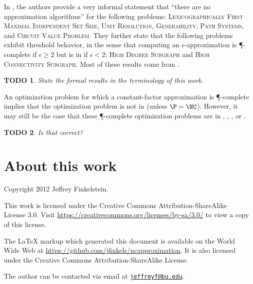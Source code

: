 \documentclass[]{article}
\theoremstyle{plain}
\newtheorem{todo}{TODO}
\theoremstyle{definition}
\newcommand{\email}[1]{\href{mailto:#1}{\nolinkurl{#1}}}
\begin{document}
In \cite[Section~10.2]{ghr95}, the authors provide a very informal statement that ``there are no \NC{} approximation algorithms'' for the following problems: \textsc{Lexicographically First Maximal Independent Set Size}, \textsc{Unit Resolution}, \textsc{Generability}, \textsc{Path Systems}, and \textsc{Circuit Value Problem}.
They further state that the following problems exhibit threshold behavior, in the sense that computing an $\epsilon$-approximation is \P-complete if $\epsilon\geq 2$ but is in \NCAS{} if $\epsilon<2$: \textsc{High Degree Subgraph} and \textsc{High Connectivity Subgraph}.
Most of these results come from \cite{ss89}.

\begin{todo}
  State the formal results in the terminology of this work.
\end{todo}

An optimization problem for which a constant-factor approximation is \P-complete implies that the optimization problem is not in \ApxNCO{} (unless $\P=\NC$).
However, it may still be the case that these \P-complete optimization problems are in \logApxNCO, \polyApxNCO, \expApxNCO, or \NNCO.

\begin{todo}
  Is that correct?
\end{todo}

\section{About this work}

Copyright 2012 Jef{}frey Finkelstein.

This work is licensed under the Creative Commons Attribution-ShareAlike License 3.0.
Visit \mbox{\url{https://creativecommons.org/licenses/by-sa/3.0/}} to view a copy of this license.

The \LaTeX{} markup which generated this document is available on the World Wide Web at \mbox{\url{https://github.com/jfinkels/ncapproximation}}.
It is also licensed under the Creative Commons Attribution-ShareAlike License.

The author can be contacted via email at \email{jeffreyf@bu.edu}.



\end{document}
